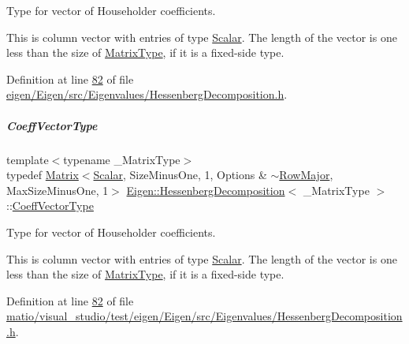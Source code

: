 Type for vector of Householder coefficients. 

This is column vector with entries of type \hyperlink{group___eigenvalues___module_a9420c36226cae7d92da8308a3f97ac2f}{Scalar}. The length of the vector is one less than the size of \hyperlink{group___eigenvalues___module_a93a611350a7db9d1da18f2c828ecea9f}{Matrix\+Type}, if it is a fixed-\/side type. 

Definition at line \hyperlink{eigen_2_eigen_2src_2_eigenvalues_2_hessenberg_decomposition_8h_source_l00082}{82} of file \hyperlink{eigen_2_eigen_2src_2_eigenvalues_2_hessenberg_decomposition_8h_source}{eigen/\+Eigen/src/\+Eigenvalues/\+Hessenberg\+Decomposition.\+h}.

\mbox{\label{group___eigenvalues___module_a567f99f3770365777b67bf9832b6fac1}} 
\subparagraph{\texorpdfstring{Coeff\+Vector\+Type}{CoeffVectorType}\hspace{0.1cm}{\footnotesize\ttfamily [2/2]}}
{\footnotesize\ttfamily template$<$typename \+\_\+\+Matrix\+Type$>$ \\
typedef \hyperlink{group___core___module_class_eigen_1_1_matrix}{Matrix}$<$\hyperlink{group___eigenvalues___module_a9420c36226cae7d92da8308a3f97ac2f}{Scalar}, Size\+Minus\+One, 1, Options \& $\sim$\hyperlink{group__enums_ggaacded1a18ae58b0f554751f6cdf9eb13acfcde9cd8677c5f7caf6bd603666aae3}{Row\+Major}, Max\+Size\+Minus\+One, 1$>$ \hyperlink{group___eigenvalues___module_class_eigen_1_1_hessenberg_decomposition}{Eigen\+::\+Hessenberg\+Decomposition}$<$ \+\_\+\+Matrix\+Type $>$\+::\hyperlink{group___eigenvalues___module_a567f99f3770365777b67bf9832b6fac1}{Coeff\+Vector\+Type}}



Type for vector of Householder coefficients. 

This is column vector with entries of type \hyperlink{group___eigenvalues___module_a9420c36226cae7d92da8308a3f97ac2f}{Scalar}. The length of the vector is one less than the size of \hyperlink{group___eigenvalues___module_a93a611350a7db9d1da18f2c828ecea9f}{Matrix\+Type}, if it is a fixed-\/side type. 

Definition at line \hyperlink{matio_2visual__studio_2test_2eigen_2_eigen_2src_2_eigenvalues_2_hessenberg_decomposition_8h_source_l00082}{82} of file \hyperlink{matio_2visual__studio_2test_2eigen_2_eigen_2src_2_eigenvalues_2_hessenberg_decomposition_8h_source}{matio/visual\+\_\+studio/test/eigen/\+Eigen/src/\+Eigenvalues/\+Hessenberg\+Decomposition.\+h}.

